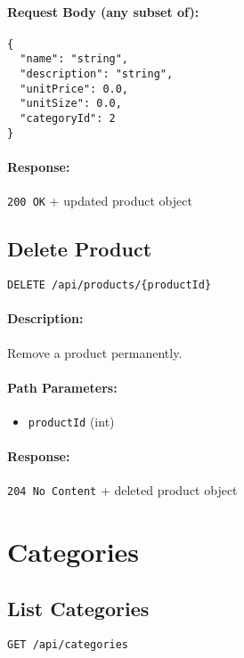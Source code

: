 \documentclass[a4paper,11pt]{article}
\begin{document}
\paragraph{Request Body (any subset of):}
\begin{verbatim}
{
  "name": "string",
  "description": "string",
  "unitPrice": 0.0,
  "unitSize": 0.0,
  "categoryId": 2
}
\end{verbatim}
\paragraph{Response:} \texttt{200 OK} + updated product object

\subsection{Delete Product}
\label{sec:products-delete}
\begin{verbatim}
DELETE /api/products/{productId}
\end{verbatim}
\paragraph{Description:} Remove a product permanently.
\paragraph{Path Parameters:}
\begin{itemize}
  \item \texttt{productId} (int)
\end{itemize}
\paragraph{Response:} \texttt{204 No Content} + deleted product object

\section{Categories}
\label{sec:categories}

\subsection{List Categories}
\label{sec:categories-all}
\begin{verbatim}
GET /api/categories
\end{verbatim}
\end{document}
